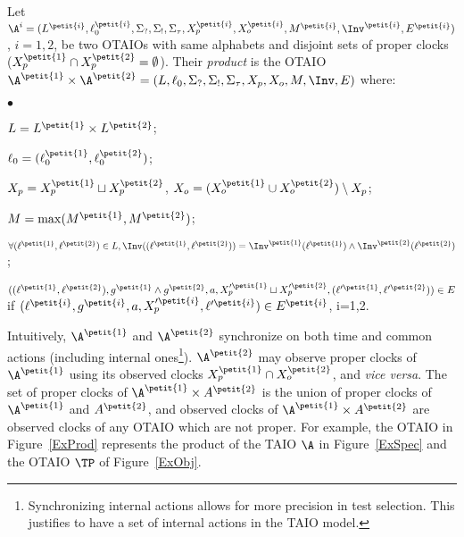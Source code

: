 \documentclass{LMCS}
\theoremstyle{plain}\newtheorem{proposition}[thm]{Proposition}
\begin{document}
\begin{defi}[Product]\label{def_product}
Let 
 $\A^i=(L^{\petit{i}},\ell_0^{\petit{i}},\Sigma_?,\Sigma_!,\Sigma_\tau,X_p^{\petit{i}},X_o^{\petit{i}},M^{\petit{i}},\Inv^{\petit{i}},E^{\petit{i}})$,
$i=1,2$, be two OTAIOs with same alphabets and disjoint sets of proper clocks ($X_p^{\petit{1}} \cap X_p^{\petit{2}}= \emptyset$).
Their {\em product} 
is the OTAIO 
$\A^{\petit{1}} \times \A^{\petit{2}} = (L,\ell_0,\Sigma_?,\Sigma_!,\Sigma_\tau,X_p,X_o,M,\Inv,E)$ where:
\begin{iteMize}{$\bullet$}
\item 
$L=L^{\petit{1}} \times L^{\petit{2}}$; 
\item 
$\ell_0 = (\ell_0^{\petit{1}},\ell_0^{\petit{2}})$;
\item 
$X_p = X_p^{\petit{1}} \sqcup X_p^{\petit{2}}$, $X_o = (X_o^{\petit{1}} \cup X_o^{\petit{2}}) \setminus X_p$;
\item 
$M= \max(M^{\petit{1}}, M^{\petit{2}})$;
\item
$\forall (\ell^{\petit{1}},\ell^{\petit{2}}) \in L, \Inv((\ell^{\petit{1}},\ell^{\petit{2}})) = \Inv^{\petit{1}}(\ell^{\petit{1}}) \wedge \Inv^{\petit{2}}(\ell^{\petit{2}})$;
\item 
$((\ell^{\petit{1}},\ell^{\petit{2}}),g^{\petit{1}} \wedge g^{\petit{2}},a,X'^{\petit{1}}_p \sqcup X'^{\petit{2}}_p,(\ell'^{\petit{1}},\ell'^{\petit{2}})) \in E$ if
$ (\ell^{\petit{i}},g^{\petit{i}},a,X'^{\petit{i}}_p,\ell'^{\petit{i}}) \in E^{\petit{i}}$, i=1,2.
\end{iteMize}
\end{defi}


Intuitively, $\A^{\petit{1}}$ and $\A^{\petit{2}}$ synchronize on both
time and common actions (including internal
ones\footnote{Synchronizing internal actions allows for more
    precision in test selection. This justifies to have a set of
    internal actions in the TAIO model.}).  $\A^{\petit{2}}$ may
observe proper clocks of $\A^{\petit{1}}$ using its observed clocks
$X_p^{\petit{1}} \cap X_o^{\petit{2}}$, and {\em vice versa}.  The set
of proper clocks of $\A^{\petit{1}} \times A^{\petit{2}}$ is the union
of proper clocks of $\A^{\petit{1}}$ and $A^{\petit{2}}$, and observed
clocks of $\A^{\petit{1}} \times A^{\petit{2}}$ are observed clocks of
any OTAIO which are not proper.  For example, the OTAIO in
Figure~\ref{ExProd} represents the product of the TAIO $\A$ in
Figure~\ref{ExSpec} and the OTAIO $\TP$ of Figure~\ref{ExObj}.
\end{document}
